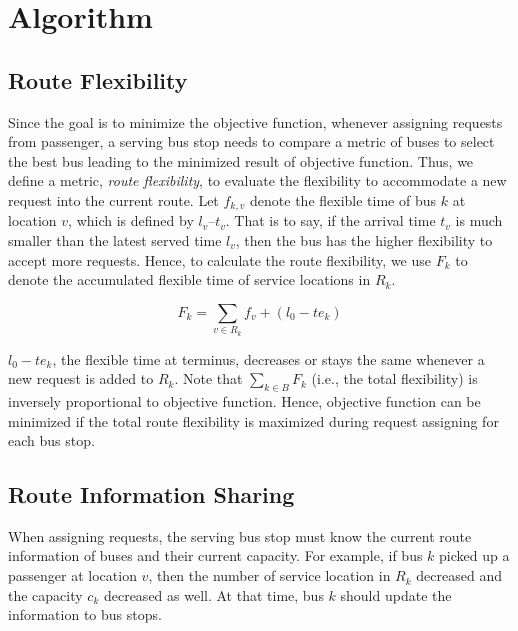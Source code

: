 \documentclass[runningheads]{llncs}
\begin{document}
\section{Algorithm}
\subsection{Route Flexibility}
Since the goal is to minimize the objective function, whenever assigning requests from passenger, a serving bus stop needs to compare a metric of buses to select the best bus leading to the minimized result of objective function. Thus, we define a metric, \emph{route flexibility}, to evaluate the flexibility to accommodate a new request into the current route. Let $f_{k,v}$ denote the flexible time of bus $k$ at location $v$, which is defined by $l_v – t_v$. That is to say, if the arrival time $t_v$ is much smaller than the latest served time $l_v$, then the bus has the higher flexibility to accept more requests. Hence, to calculate the route flexibility, we use $F_k$ to denote the accumulated flexible time of service locations in $R_k$.

\begin{equation}
F_k = \sum_{v\in R_k}{f_v} + (l_0 - te_k)
\end{equation}

$l_0 - te_k$, the flexible time at terminus, decreases or stays the same whenever a new request is added to $R_k$. Note that $\sum_{k\in B}{F_k}$ (i.e., the total flexibility) is inversely proportional to objective function. Hence, objective function can be minimized if the total route flexibility is maximized during request assigning for each bus stop.

\subsection{Route Information Sharing}
When assigning requests, the serving bus stop must know the current route information of buses and their current capacity. For example, if bus $k$ picked up a passenger at location $v$, then the number of service location in $R_k$ decreased and the capacity $c_k$ decreased as well. At that time, bus $k$ should update the information to bus stops.
\end{document}
